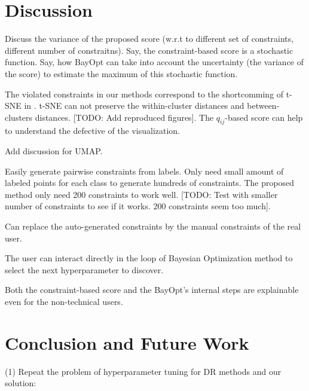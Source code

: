 \section{Discussion}\label{sec:discussion}

\par
Discuss the variance of the proposed score (w.r.t to different set of constraints, different number of constraitns).
Say, the constraint-based score is a stochastic function.
Say, how BayOpt can take into account the uncertainty (the variance of the score) to estimate the maximum of this stochastic function.


\par
The violated constraints in our methods correspond to the shortcomming of t-SNE in \cite{wattenberg2016use}.
t-SNE can not preserve the within-cluster distances and between-clusters distances.
[TODO: Add reproduced figures].
The $q_{ij}$-based score can help to understand the defective of the visualization.

\par
Add discussion for UMAP.

\par
Easily generate pairwise constraints from labels.
  Only need small amount of labeled points for each class to generate hundreds of constraints.
  The proposed method only need 200 constraints to work well.
  [TODO: Test with smaller number of constraints to see if it works. 200 constraints seem too much].

\par
Can replace the auto-generated constraints by the manual constraints of the real user.

\par
The user can interact directly in the loop of Bayesian Optimization method to select the next hyperparameter to discover.


\par
Both the constraint-based score and the BayOpt's internal steps are explainable even for the non-technical users. 



\section{Conclusion and Future Work}\label{sec:ccl}

\par (1) Repeat the problem of hyperparameter tuning for DR methods and our solution:

